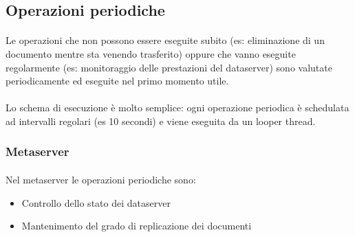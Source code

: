 \documentclass{article}
\begin{document}
\subsection{Operazioni periodiche}

\paragraph{} Le operazioni che non possono essere eseguite subito (es: eliminazione di un documento mentre sta venendo trasferito) oppure che vanno eseguite regolarmente (es: monitoraggio delle prestazioni del dataserver) sono valutate periodicamente ed eseguite nel primo momento utile. 

\paragraph{} Lo schema di esecuzione è molto semplice: ogni operazione periodica è schedulata ad intervalli regolari (es 10 secondi) e viene eseguita da un looper thread.

\subsubsection{Metaserver}

\paragraph{} Nel metaserver le operazioni periodiche sono:\begin{itemize}
	\item Controllo dello stato dei dataserver
	\item Mantenimento del grado di replicazione dei documenti
\end{itemize}
\end{document}
